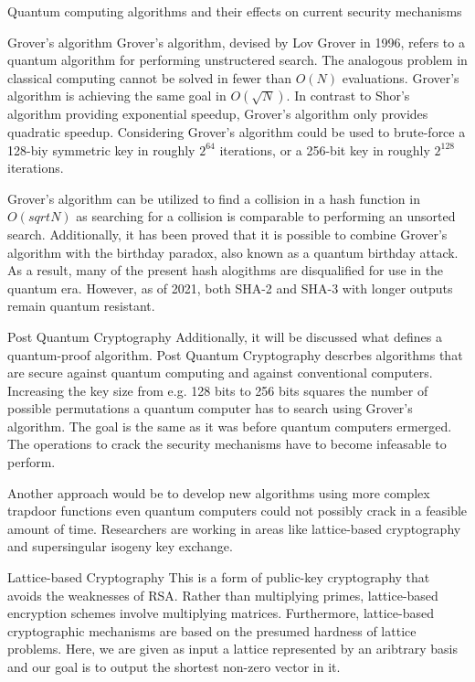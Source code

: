 \documentclass[aps,preprintnumbers,twocolumn]{revtex4}
\begin{document}
\begin{section}{Quantum computing algorithms and their effects on current security mechanisms}
\begin{subsection}{Grover's algorithm}
Grover's algorithm, devised by Lov Grover in 1996,
refers to a quantum algorithm for performing unstructered search. 
The analogous problem in classical computing cannot be solved in fewer than $O(N)$ evaluations. 
Grover's algorithm is achieving the same goal in $O(\sqrt{N})$. 
In contrast to Shor's algorithm providing exponential speedup, 
Grover's algorithm only provides quadratic speedup. 
Considering Grover's algorithm could be used to brute-force a 128-biy symmetric key in roughly $2^{64}$ iterations, 
or a 256-bit key in roughly $2^{128}$ iterations.

Grover's algorithm can be utilized to find a collision in a hash function in $O(sqrt{N})$ as searching for a collision is comparable to performing an unsorted search.
Additionally, it has been proved that it is possible to combine Grover's algorithm with the birthday paradox, 
also known as a quantum birthday attack. 
As a result, many of the present hash alogithms are disqualified for use in the quantum era. 
However, as of 2021, both SHA-2 and SHA-3 with longer outputs remain quantum resistant.
\end{subsection}

\end{section}

\begin{section}{Post Quantum Cryptography}
Additionally, it will be discussed what defines a quantum-proof algorithm. 
Post Quantum Cryptography descrbes algorithms that are secure against quantum computing and against conventional computers.
Increasing the key size from e.g. 128 bits to 256 bits squares the number of possible permutations a quantum computer has to search using Grover's algorithm.
The goal is the same as it was before quantum computers ermerged.
The operations to crack the security mechanisms have to become infeasable to perform. 

Another approach would be to develop new algorithms using more complex trapdoor functions even quantum computers could not possibly crack in a feasible amount of time. 
Researchers are working in areas like lattice-based cryptography and supersingular isogeny key exchange. 

\begin{subsection}{Lattice-based Cryptography}
This is a form of public-key cryptography that avoids the weaknesses of RSA. 
Rather than multiplying primes, lattice-based encryption schemes involve multiplying matrices. 
Furthermore, lattice-based cryptographic mechanisms are based on the presumed hardness of lattice problems. 
Here, we are given as input a lattice represented by an aribtrary basis and our goal is to output the shortest non-zero vector in it.
\end{subsection}

\end{section}
\end{document}
